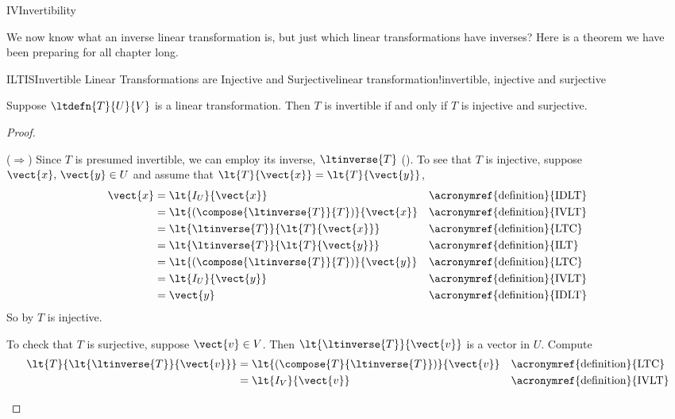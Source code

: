 %
\begin{subsect}{IV}{Invertibility}
%
\begin{para}We now know what an inverse linear transformation is, but just which linear transformations have inverses?  Here is a theorem we have been preparing for all chapter long.\end{para}
%
\begin{theorem}{ILTIS}{Invertible Linear Transformations are Injective and Surjective}{linear transformation!invertible, injective and surjective}
\begin{para}Suppose $\ltdefn{T}{U}{V}$ is a linear transformation.  Then $T$ is invertible if and only if $T$ is injective and surjective.\end{para}
\end{theorem}
%
\begin{proof}
\begin{para}($\Rightarrow$)  Since $T$ is presumed invertible, we can employ its inverse, $\ltinverse{T}$ ().  To see that $T$ is injective, suppose $\vect{x},\,\vect{y}\in U$ and assume that $\lt{T}{\vect{x}}=\lt{T}{\vect{y}}$,
%
\begin{align*}
\vect{x}
&=\lt{I_U}{\vect{x}}&&\text{\acronymref{definition}{IDLT}}\\
&=\lt{\left(\compose{\ltinverse{T}}{T}\right)}{\vect{x}}&&\text{\acronymref{definition}{IVLT}}\\
&=\lt{\ltinverse{T}}{\lt{T}{\vect{x}}}&&\text{\acronymref{definition}{LTC}}\\
&=\lt{\ltinverse{T}}{\lt{T}{\vect{y}}}&&\text{\acronymref{definition}{ILT}}\\
&=\lt{\left(\compose{\ltinverse{T}}{T}\right)}{\vect{y}}&&\text{\acronymref{definition}{LTC}}\\
&=\lt{I_U}{\vect{y}}&&\text{\acronymref{definition}{IVLT}}\\
&=\vect{y}&&\text{\acronymref{definition}{IDLT}}
%
\end{align*}
%
So by  $T$ is injective.\end{para}
%
\begin{para}To check that $T$ is surjective, suppose $\vect{v}\in V$.  Then $\lt{\ltinverse{T}}{\vect{v}}$ is a vector in $U$.  Compute
%
\begin{align*}
%
\lt{T}{\lt{\ltinverse{T}}{\vect{v}}}
&=\lt{\left(\compose{T}{\ltinverse{T}}\right)}{\vect{v}}&&\text{\acronymref{definition}{LTC}}\\
&=\lt{I_V}{\vect{v}}&&\text{\acronymref{definition}{IVLT}}\\

\end{align*}
\end{para}
\end{proof}
\end{subsect}
